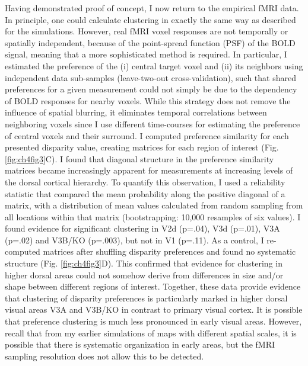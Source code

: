 Having demonstrated proof of concept, I now return to the empirical fMRI data. In principle, one could calculate clustering in exactly the same way as described for the simulations. However, real fMRI voxel responses are not temporally or spatially independent, because of the point-spread function (PSF) of the BOLD signal, meaning that a more sophisticated method is required. In particular, I estimated the preference of the (i) central target voxel and (ii) its neighbors using independent data sub-samples (leave-two-out cross-validation), such that shared preferences for a given measurement could not simply be due to the dependency of BOLD responses for nearby voxels. While this strategy does not remove the influence of spatial blurring, it eliminates temporal correlations between neighboring voxels since I use different time-courses for estimating the preference of central voxels and their surround. I computed preference similarity for each presented disparity value, creating matrices for each region of interest (Fig. \ref{fig:ch4fig3}C). I found that diagonal structure in the preference similarity matrices became increasingly apparent for measurements at increasing levels of the dorsal cortical hierarchy. To quantify this observation, I used a reliability statistic that compared the mean probability along the positive diagonal of a matrix, with a distribution of mean values calculated from random sampling from all locations within that matrix (bootstrapping: 10,000 resamples of six values). I found evidence for significant clustering in V2d (p=.04), V3d (p=.01), V3A (p=.02) and V3B/KO (p=.003), but not in V1 (p=.11). As a control, I re-computed matrices after shuffling disparity preferences and found no systematic structure (Fig. \ref{fig:ch4fig3}D). This confirmed that evidence for clustering in higher dorsal areas could not somehow derive from differences in size and/or shape between different regions of interest. Together, these data provide evidence that clustering of disparity preferences is particularly marked in higher dorsal visual areas V3A and V3B/KO in contrast to primary visual cortex. It is possible that preference clustering is much less pronounced in early visual areas. However, recall that from my earlier simulations of maps with different spatial scales, it is possible that there is systematic organization in early areas, but the fMRI sampling resolution does not allow this to be detected.

